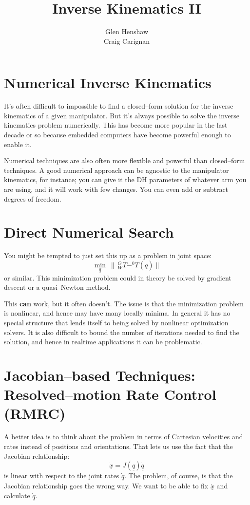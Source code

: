 \documentclass[]{article}
\title{Inverse Kinematics II}
\author{Glen Henshaw\\Craig Carignan}
\begin{document}
\maketitle


\section{Numerical Inverse Kinematics}
It's often difficult to impossible to find a closed--form solution for the inverse kinematics of a given manipulator. But it's always possible to solve the inverse kinematics problem numerically. This has become more popular in the last decade or so because embedded computers have become powerful enough to enable it.

Numerical techniques are also often more flexible and powerful than closed--form techniques. A good numerical approach can be agnostic to the manipulator kinematics, for instance; you can give it the DH parameters of whatever arm you are using, and it will work with few changes. You can even add or subtract degrees of freedom.

\section{Direct Numerical Search}
You might be tempted to just set this up as a problem in joint space:
\begin{displaymath}
\min_{\underline{q}}\ \|\ \!^{O}_{W}T - ^{0}T(\underline{q})\|
\end{displaymath}
or similar. This minimization problem could in theory be solved by gradient descent or a quasi--Newton method.

This \textbf{can} work, but it often doesn't. The issue is that the minimization problem is nonlinear, and hence may have many locally minima. In general it has no special structure that lends itself to being solved by nonlinear optimization solvers. It is also difficult to bound the number of iterations needed to find the solution, and hence in realtime applications it can be problematic.

\section{Jacobian--based Techniques: Resolved--motion Rate Control (RMRC)}
A better idea is to think about the problem in terms of Cartesian velocities and rates instead of positions and orientations. That lets us use the fact that the Jacobian relationship:
\begin{displaymath}
\dot{\underline{x}} = J(\underline{q})\dot{\underline{q}}
\end{displaymath}
is linear with respect to the joint rates $\dot{\underline{q}}$. The problem, of course, is that the Jacobian relationship goes the wrong way. We want to be able to fix $\dot{\underline{x}}$ and calculate $\dot{\underline{q}}$.
\end{document}
